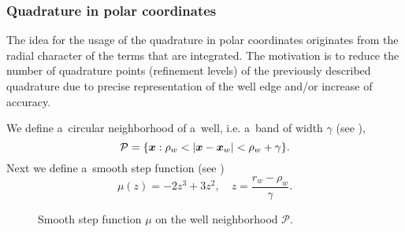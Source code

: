 \subsubsection{Quadrature in polar coordinates}

The idea for the usage of the quadrature in polar coordinates originates from the radial character of the terms
that are integrated. 
The motivation is to reduce the number of quadrature points (refinement levels) of the previously described quadrature due to
precise representation of the well edge and/or increase of accuracy.

We define a~circular neighborhood of a~well, i.e. a~band of width $\gamma$ (see ),
\begin{equation}
    \mathcal{P} = \{\mathbf{\boldsymbol{x}}: \rho_w < \left|\mathbf{\boldsymbol{x}} - \mathbf{\boldsymbol{x}}_w\right| < \rho_w + \gamma \}.
\end{equation} 
Next we define a~smooth step function (see )
\begin{equation}
    \mu(z) = -2 z^3 +3 z^2,\quad z=\frac{r_w-\rho_w}{\gamma}.
\end{equation} 
%
\begin{figure}[!htb]
  \vspace{-35pt}
  \centering    
  \hspace{0pt}
  \caption[Smooth step function]
  {Smooth step function $\mu$ on the well neighborhood $\mathcal{P}$.
  }
  \label{fig:smooth_step_well_band}
\end{figure}    

